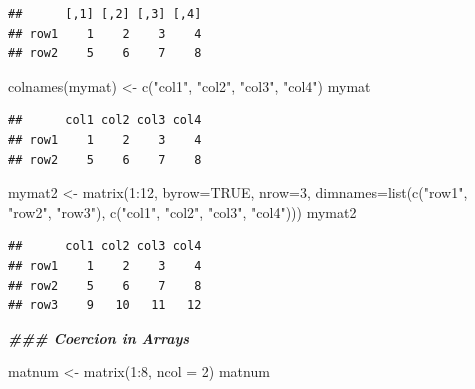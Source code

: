 \documentclass[
]{book}
\newenvironment{Shaded}{\begin{snugshade}}{\end{snugshade}}
\newcommand{\AttributeTok}[1]{\textcolor[rgb]{0.77,0.63,0.00}{#1}}
\newcommand{\ConstantTok}[1]{\textcolor[rgb]{0.00,0.00,0.00}{#1}}
\newcommand{\DecValTok}[1]{\textcolor[rgb]{0.00,0.00,0.81}{#1}}
\newcommand{\DocumentationTok}[1]{\textcolor[rgb]{0.56,0.35,0.01}{\textbf{\textit{#1}}}}
\newcommand{\FunctionTok}[1]{\textcolor[rgb]{0.00,0.00,0.00}{#1}}
\newcommand{\NormalTok}[1]{#1}
\newcommand{\OtherTok}[1]{\textcolor[rgb]{0.56,0.35,0.01}{#1}}
\newcommand{\SpecialCharTok}[1]{\textcolor[rgb]{0.00,0.00,0.00}{#1}}
\newcommand{\StringTok}[1]{\textcolor[rgb]{0.31,0.60,0.02}{#1}}
\begin{document}
\begin{verbatim}
##      [,1] [,2] [,3] [,4]
## row1    1    2    3    4
## row2    5    6    7    8
\end{verbatim}

\begin{Shaded}
\begin{Highlighting}[]
\FunctionTok{colnames}\NormalTok{(mymat) }\OtherTok{\textless{}{-}} \FunctionTok{c}\NormalTok{(}\StringTok{"col1"}\NormalTok{, }\StringTok{"col2"}\NormalTok{, }\StringTok{"col3"}\NormalTok{, }\StringTok{"col4"}\NormalTok{)}
\NormalTok{mymat}
\end{Highlighting}
\end{Shaded}

\begin{verbatim}
##      col1 col2 col3 col4
## row1    1    2    3    4
## row2    5    6    7    8
\end{verbatim}

\begin{Shaded}
\begin{Highlighting}[]
\NormalTok{mymat2 }\OtherTok{\textless{}{-}} \FunctionTok{matrix}\NormalTok{(}\DecValTok{1}\SpecialCharTok{:}\DecValTok{12}\NormalTok{, }\AttributeTok{byrow=}\ConstantTok{TRUE}\NormalTok{, }\AttributeTok{nrow=}\DecValTok{3}\NormalTok{, }\AttributeTok{dimnames=}\FunctionTok{list}\NormalTok{(}\FunctionTok{c}\NormalTok{(}\StringTok{"row1"}\NormalTok{, }\StringTok{"row2"}\NormalTok{, }\StringTok{"row3"}\NormalTok{),}
                                                         \FunctionTok{c}\NormalTok{(}\StringTok{"col1"}\NormalTok{, }\StringTok{"col2"}\NormalTok{, }\StringTok{"col3"}\NormalTok{, }\StringTok{"col4"}\NormalTok{)))}
\NormalTok{mymat2}
\end{Highlighting}
\end{Shaded}

\begin{verbatim}
##      col1 col2 col3 col4
## row1    1    2    3    4
## row2    5    6    7    8
## row3    9   10   11   12
\end{verbatim}

\begin{Shaded}
\begin{Highlighting}[]
\DocumentationTok{\#\#\# Coercion in Arrays}

\NormalTok{matnum }\OtherTok{\textless{}{-}} \FunctionTok{matrix}\NormalTok{(}\DecValTok{1}\SpecialCharTok{:}\DecValTok{8}\NormalTok{, }\AttributeTok{ncol =} \DecValTok{2}\NormalTok{)}
\NormalTok{matnum}
\end{Highlighting}
\end{Shaded}
\end{document}
